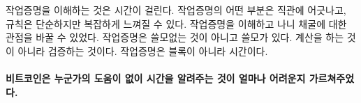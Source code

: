 \begin{comment}
	Understanding proof-of-work takes time. It is often counter-intuitive,
	and while the rules are simple, they lead to quite complex phenomena.
	For me, shifting my perspective on mining helped. Useful, not useless.
	Validation, not computation. Time, not blocks.
\end{comment}
작업증명을 이해하는 것은 시간이 걸린다.
작업증명의 어떤 부분은 직관에 어긋나고, 규칙은 단순하지만 복잡하게 느껴질 수 있다.
작업증명을 이해하고 나니 채굴에 대한 관점을 바꿀 수 있었다.
작업증명은 쓸모없는 것이 아니고 쓸모가 있다.
계산을 하는 것이 아니라 검증하는 것이다.
작업증명은 블록이 아니라 시간이다.

\paragraph{비트코인은 누군가의 도움이 없이 시간을 알려주는 것이 얼마나 어려운지 가르쳐주었다.}

%
%
%
%
%
%
%
